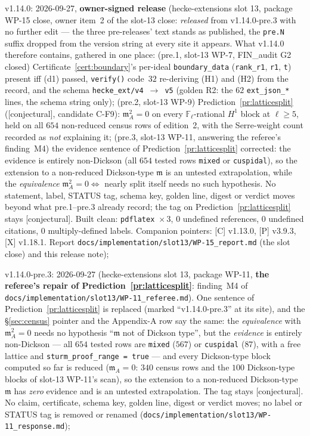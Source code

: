 \documentclass[11pt]{article}
\theoremstyle{remark}
\newcommand{\F}{\mathbb{F}}
\newcommand{\Fl}{\F_\ell}
\newcommand{\m}{\mathfrak{m}}
\newcommand{\CONJ}{\textsf{[conjectural]}}
\begin{document}
v1.14.0: 2026-09-27, \textbf{owner-signed release} (hecke-extensions slot 13, package WP-15
close, owner item~2 of the slot-13 close: \emph{released} from v1.14.0-pre.3 with no further edit --- the three
pre-releases' text stands as published, the \texttt{pre.N} suffix dropped from the version string at every site
it appears. What v1.14.0 therefore contains, gathered in one place: (pre.1, slot-13 WP-7, FIN\_audit G2 closed)
Certificate~\ref{cert:boundary}'s per-ideal \texttt{boundary\_data} (\texttt{rank\_r1}, \texttt{r1}, \texttt{t})
present iff (d1) passed, \texttt{verify()} code~$32$ re-deriving (H1) and (H2) from the record, and the schema
\texttt{hecke\_ext/v4}~$\to$~\texttt{v5} (golden R2: the $62$ \texttt{ext\_json\_*} lines, the schema string
only); (pre.2, slot-13 WP-9) Prediction~\ref{pr:latticesplit} (\CONJ, candidate C-F9): $\m_A^2=0$ on every
$\Fl$-rational $H^1$ block at $\ell\ge5$, held on all $654$ non-reduced census rows of edition~2, with the
Serre-weight count recorded as \emph{not} explaining it; (pre.3, slot-13 WP-11, answering the referee's
finding~M4) the evidence sentence of Prediction~\ref{pr:latticesplit} corrected: the evidence is entirely
non-Dickson (all $654$ tested rows \texttt{mixed} or \texttt{cuspidal}), so the extension to a non-reduced
Dickson-type $\m$ is an untested extrapolation, while the \emph{equivalence} $\m_A^2=0 \Leftrightarrow$ nearly
split itself needs no such hypothesis. No statement, label, STATUS tag, schema key, golden line, digest or
verdict moves beyond what pre.1--pre.3 already record; the tag on Prediction~\ref{pr:latticesplit} stays \CONJ.
Built clean: \texttt{pdflatex}~$\times\,3$, $0$ undefined references, $0$ undefined citations, $0$ multiply-defined
labels. Companion pointers: [C] v1.13.0, [P] v3.9.3, [X] v1.18.1. Report
\texttt{docs/implementation/slot13/WP-15\_report.md} (the slot close) and this release note);

v1.14.0-pre.3: 2026-09-27 (hecke-extensions slot 13, package WP-11, \textbf{the referee's
repair of Prediction~\ref{pr:latticesplit}}: finding~M4 of \texttt{docs/implementation/slot13/WP-11\_referee.md}).
One sentence of Prediction~\ref{pr:latticesplit} is replaced (marked ``v1.14.0-pre.3'' at its site), and the
\S\ref{sec:census} pointer and the Appendix-A row say the same: the \emph{equivalence} with $\m_A^2=0$ needs no
hypothesis ``$\m$ not of Dickson type'', but the \emph{evidence} is entirely non-Dickson --- all $654$ tested rows are
\texttt{mixed} ($567$) or \texttt{cuspidal} ($87$), with a free lattice and \texttt{sturm\_proof\_range = true} ---
and every Dickson-type block computed so far is reduced ($\m_A=0$: $340$ census rows and the $100$ Dickson-type
blocks of slot-13 WP-11's scan), so the extension to a non-reduced Dickson-type $\m$ has \emph{zero} evidence and
is an untested extrapolation. The tag stays \CONJ. No claim, certificate, schema key, golden line, digest or
verdict moves; no label or STATUS tag is removed or renamed (\texttt{docs/implementation/slot13/WP-11\_response.md});
\end{document}
